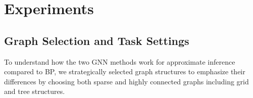\documentclass{article}
\begin{document}
\section{Experiments}
\subsection{Graph Selection and Task Settings}
To understand how the two GNN methods work for approximate inference compared to BP, we strategically selected graph structures to emphasize their differences by choosing both sparse and highly connected graphs including grid and tree structures. 


\end{document}
